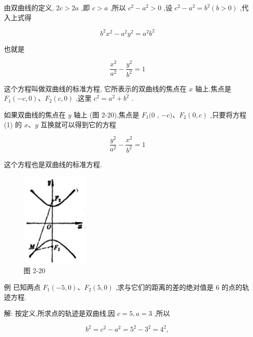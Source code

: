 \documentclass[lang=cn,newtx,10.5pt,scheme=chinese]{elegantbook}
\begin{document}
由双曲线的定义, \({2c} > {2a}\) ,即 \(c > a\) ,所以 \({c}^{2} - {a}^{2} > 0\) ,设 \({c}^{2} - {a}^{2} = {b}^{2}\left( {b > 0}\right)\) ,代入上式得

\[
    {b}^{2}{x}^{2} - {a}^{2}{y}^{2} = {a}^{2}{b}^{2}
\]

也就是
\begin{definition}[双曲线的标准方程] 
\[
  \frac{{x}^{2}}{{a}^{2}} - \frac{{y}^{2}}{{b}^{2}} = 1 \tag{1}
\]

这个方程叫做双曲线的标准方程, 它所表示的双曲线的焦点在 \(x\) 轴上,焦点是 \({F}_{1}\left( {-c,0}\right) \text{、}{F}_{2}\left( {c,0}\right)\) ,这里 \({c}^{2} = {a}^{2} + {b}^{2}\) .
\end{definition}

\begin{corollary}[双曲线标准方程2]
	

如果双曲线的焦点在 \(y\) 轴上 (图 2-20),焦点是 \({F}_{1}(0\) , \(- c)\text{、}{F}_{2}\left( {0,c}\right)\) ,只要将方程 (1) 的 \(x\text{、}y\) 互换就可以得到它的方程

\[
  \frac{{y}^{2}}{{a}^{2}} - \frac{{x}^{2}}{{b}^{2}} = 1
\]

这个方程也是双曲线的标准方程.

\end{corollary}
\begin{figure}[h]
  \centering
  \includegraphics[max width=0.3\textwidth]{images/01912cc2-ffb6-728e-9ae7-b113ff05c64b_98_269004.jpg}
  \caption{图 2-20}
\end{figure}





例 已知两点 \({F}_{1}\left( {-5,0}\right) \text{、}{F}_{2}\left( {5,0}\right)\) ,求与它们的距离的差的绝对值是 6 的点的轨迹方程.

解: 按定义,所求点的轨迹是双曲线,因 \(c = 5,a = 3\) ,所以

\[
    {b}^{2} = {c}^{2} - {a}^{2} = {5}^{2} - {3}^{2} = {4}^{2},
\]
\end{document}
